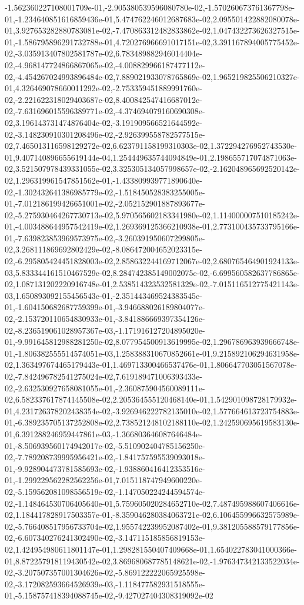 -1.562360227108001709e-01,-2.905380539596080780e-02,-1.570260673761367798e-01,-1.234640851616859436e-01,5.474762246012687683e-02,2.095501422882080078e-01,3.927653282880783081e-02,-7.470863312482833862e-02,1.047432273626327515e-01,-1.586795896291732788e-01,4.720276966691017151e-02,3.391167894005775452e-02,-3.035913407802581787e-02,6.783489882946014404e-02,-4.968147724866867065e-02,-4.008829966187477112e-02,-4.454267024993896484e-02,7.889021933078765869e-02,1.965219825506210327e-01,4.326469078660011292e-02,-2.753359451889991760e-02,-2.221622318029403687e-02,8.400842547416687012e-02,-7.631696015596389771e-02,-4.374694079160690308e-02,3.196143731474876404e-02,-3.191909566521644592e-02,-3.148230910301208496e-02,-2.926399558782577515e-02,7.465013116598129272e-02,6.623791158199310303e-02,1.372294276952743530e-01,9.407140896655619144e-04,1.254449635744094849e-01,2.198655717074871063e-02,3.521507978439331055e-02,3.325305134057998657e-02,-2.162048965692520142e-02,1.296319961547851562e-01,-1.433809939771890640e-02,-1.302432641386985779e-02,-1.518450528383255005e-01,-7.012186199426651001e-02,-2.052152901887893677e-02,-5.275930464267730713e-02,5.970565602183341980e-02,1.114000007510185242e-01,-4.003488644957542419e-02,1.269369125366210938e-01,2.773100435733795166e-01,-7.639823853969573975e-02,-3.260391950607299805e-02,3.268111869692802429e-02,-8.086472004652023315e-02,-6.295805424451828003e-02,2.858632244169712067e-02,2.680765464901924133e-03,5.833344161510467529e-02,8.284742385149002075e-02,-6.699560582637786865e-02,1.087131202220916748e-01,2.538514323532581329e-02,-7.015116512775421143e-03,1.650893092155456543e-01,-2.351443469524383545e-01,-1.604150682687759399e-01,-3.946688026189804077e-02,-2.153720110654830933e-01,-3.841886669397354126e-02,-8.236519061028957367e-03,-1.171916127204895020e-01,-9.991645812988281250e-02,8.077954500913619995e-02,1.296786963939666748e-01,-1.806382555514574051e-03,1.258388310670852661e-01,9.215892106294631958e-02,1.363497674465179443e-01,1.469713300466537476e-01,1.806647703051567078e-02,-7.842496782541275024e-02,7.619189471006393433e-02,-2.632530927658081055e-01,-2.360875904560089111e-02,6.582337617874145508e-02,2.205364555120468140e-01,1.542901098728179932e-01,4.231726378202438354e-02,-3.926946222782135010e-02,1.577664613723754883e-01,-6.389235705137252808e-02,2.738521248102188110e-02,1.242590695619583130e-01,6.391288246959447861e-03,-1.366803646087646484e-01,-8.506939560174942017e-02,-5.510902404785156250e-02,-7.789208739995956421e-02,-1.841757595539093018e-01,-9.928904473781585693e-02,-1.938860416412353516e-01,-1.299229562282562256e-01,7.015118747949600220e-02,-5.159562081098556519e-02,-1.147050224244594574e-02,-1.148464530706405640e-01,5.759605020284652710e-02,7.487495988607406616e-02,1.184417828917503357e-01,-8.359046280384063721e-02,6.106455996632575989e-02,-5.766408517956733704e-02,1.955742239952087402e-01,9.381205588579177856e-02,-6.607340276241302490e-02,-3.147115185856819153e-02,1.424954980611801147e-01,1.298281550407409668e-01,1.654022783041000366e-01,8.872257918119430542e-02,3.869680687785148621e-02,-1.976347342133522034e-02,-3.207507357001304626e-02,-5.869122222065925598e-02,-3.172082593664526939e-03,-1.118477582931518555e-01,-5.158757418394088745e-02,-9.427027404308319092e-02
